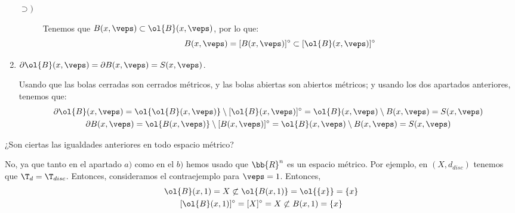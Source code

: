\begin{ejercicio}
\begin{enumerate}[label=\alph*)]
\begin{description}
            \item[$\supset)$] Tenemos que $B(x,\veps)\subset \ol{B}(x,\veps)$, por lo que:
            \begin{equation*}
                B(x,\veps)=[B(x,\veps)]^\circ \subset [\ol{B}(x,\veps)]^\circ
            \end{equation*}
        \end{description}
        
        \item $\partial \ol{B}(x,\veps) = \partial B(x,\veps) = S(x,\veps)$.

        Usando que las bolas cerradas son cerrados métricos, y las bolas abiertas son abiertos métricos; y usando los dos apartados anteriores, tenemos que:
        \begin{gather*}
            \partial \ol{B}(x,\veps) = \ol{\ol{B}(x,\veps)} \setminus [\ol{B}(x,\veps)]^\circ = \ol{B}(x,\veps)\setminus B(x,\veps)=S(x,\veps) \\
            \partial {B}(x,\veps) = \ol{{B}(x,\veps)} \setminus [{B}(x,\veps)]^\circ = \ol{B}(x,\veps)\setminus B(x,\veps)=S(x,\veps)
        \end{gather*}
        
    \end{enumerate}
    ¿Son ciertas las igualdades anteriores en todo espacio métrico?

    No, ya que tanto en el apartado $a)$  como en el $b)$ hemos usado que $\bb{R}^n$ es un espacio métrico. Por ejemplo, en $(X,d_{disc})$ tenemos que $\T_d=\T_{disc}$. Entonces, consideramos el contraejemplo para $\veps=1$. Entonces,
    \begin{gather*}
        \ol{B}(x,1)=X\not\subset \ol{B(x,1)}=\ol{\{x\}}=\{x\}\\
        [\ol{B}(x,1)]^\circ = [X]^\circ = X \not\subset B(x,1)=\{x\}
    \end{gather*}
\end{ejercicio}

